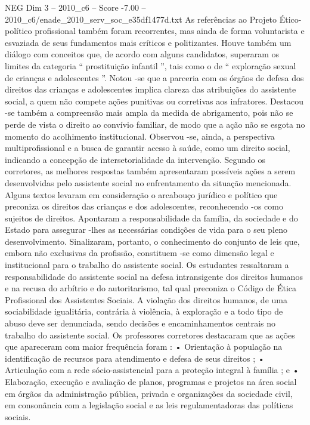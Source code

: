 \begin{textsample}{NEG Dim 3 – 2010\_c6 – Score -7.00 – 2010\_c6/enade\_2010\_serv\_soc\_e35df1477d.txt}
As referências ao Projeto Ético-político profissional também foram recorrentes, mas ainda de forma voluntarista e esvaziada de seus fundamentos mais críticos e politizantes.
Houve também um diálogo com conceitos que, de acordo com alguns candidatos, superaram os limites da categoria “ prostituição infantil ”, tais como o de “ exploração sexual de crianças e adolescentes ”.
Notou -se que a parceria com os órgãos de defesa dos direitos das crianças e adolescentes implica clareza das atribuições do assistente social, a quem não compete ações punitivas ou corretivas aos infratores.
Destacou -se também a compreensão mais ampla da medida de abrigamento, pois não se perde de vista o direito ao convívio familiar, de modo que a ação não se esgota no momento do acolhimento institucional.
Observou -se, ainda, a perspectiva multiprofissional e a busca de garantir acesso à saúde, como um direito social, indicando a concepção de intersetorialidade da intervenção.
Segundo os corretores, as melhores respostas também apresentaram possíveis ações a serem desenvolvidas pelo assistente social no enfrentamento da situação mencionada.
Alguns textos levaram em consideração o arcabouço jurídico e político que preconiza os direitos das crianças e dos adolescentes, reconhecendo -os como sujeitos de direitos.
Apontaram a responsabilidade da família, da sociedade e do Estado para assegurar -lhes as necessárias condições de vida para o seu pleno desenvolvimento.
Sinalizaram, portanto, o conhecimento do conjunto de leis que, embora não exclusivas da profissão, constituem -se como dimensão legal e institucional para o trabalho do assistente social.
Os estudantes ressaltaram a responsabilidade do assistente social na defesa intransigente dos direitos humanos e na recusa do arbítrio e do autoritarismo, tal qual preconiza o Código de Ética Profissional dos Assistentes Sociais.
A violação dos direitos humanos, de uma sociabilidade igualitária, contrária à violência, à exploração e a todo tipo de abuso deve ser denunciada, sendo decisões e encaminhamentos centrais no trabalho do assistente social.
Os professores corretores destacaram que as ações que apareceram com maior frequência foram : • Orientação à população na identificação de recursos para atendimento e defesa de seus direitos ; • Articulação com a rede sócio-assistencial para a proteção integral à família ; e • Elaboração, execução e avaliação de planos, programas e projetos na área social em órgãos da administração pública, privada e organizações da sociedade civil, em consonância com a legislação social e as leis regulamentadoras das políticas sociais.

\end{textsample}
